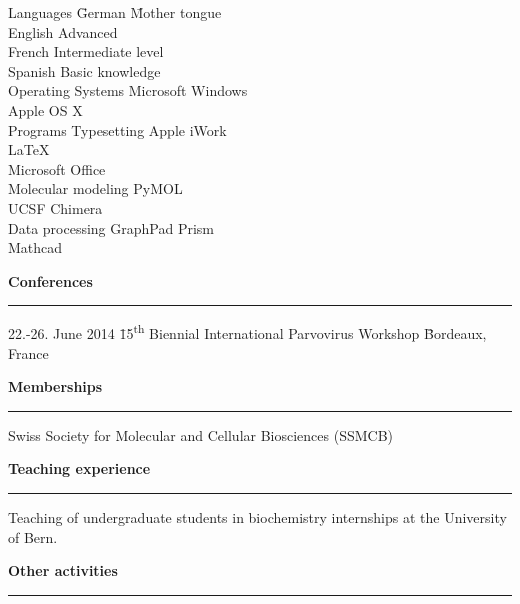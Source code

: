 \normalsize
\begin{tabbing}
Languages \hspace{2.2cm} \= German \hspace{2.5cm} \= Mother tongue \\[0.1cm]
\> English \> Advanced \\ [0.1cm]
\> French \> Intermediate level \\[0.1cm]
\> Spanish \> Basic knowledge \\ [0.3cm]
Operating Systems \> Microsoft Windows \\[0.1cm]
\> Apple OS X \\ [0.3cm]

Programs \> Typesetting \> Apple iWork \\[0.1cm] 
\> \> \LaTeX \\[0.1cm]
\> \> Microsoft Office \\[0.1cm]
\> Molecular modeling \> PyMOL \\
\> \> UCSF Chimera \\ [0.1cm]
\> Data processing \> GraphPad Prism \\
\> \> Mathcad 
\end{tabbing}

\vspace{0.5 cm}

\Large
\textbf{Conferences}
\noindent\rule[0mm]{\linewidth}{2pt}

\normalsize
\begin{tabbing}
22.-26. June 2014 \hspace{0.8 cm} \= 15\textsuperscript{th} Biennial International Parvovirus Workshop \hspace{0.4 cm} \= Bordeaux, France

\end{tabbing}
\vspace{0.5 cm}


\Large
\textbf{Memberships}
\noindent\rule[0mm]{\linewidth}{2pt}

\normalsize
\vspace{0.3 cm}
Swiss Society for Molecular and Cellular Biosciences (SSMCB)

\vspace{0.8 cm}
\Large
\textbf{Teaching experience}
\noindent\rule[0mm]{\linewidth}{2pt}
\normalsize
Teaching of undergraduate students in biochemistry internships at the University of Bern.


\clearpage
\vspace{0.5 cm}
\Large
\textbf{Other activities}
\noindent\rule[0mm]{\linewidth}{2pt}
\normalsize



